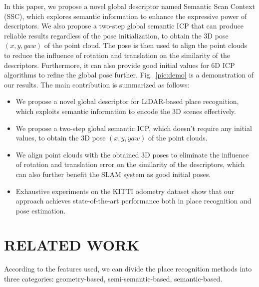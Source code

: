 \documentclass[letterpaper, 10 pt, conference]{ieeeconf}
\begin{document}
In this paper, we propose a novel global descriptor named Semantic Scan Context (SSC), which explores semantic information to enhance the expressive power of descriptors. We also propose a two-step global semantic ICP that can produce reliable results regardless of the pose initialization, to obtain the 3D pose $(x,y,yaw)$ of the point cloud. The pose is then used to align the point clouds to reduce the influence of rotation and translation on the similarity of the descriptors. Furthermore, it can also provide good initial values for 6D ICP algorithms to refine the global pose further. Fig.~\ref{pic:demo} is a demonstration of our results. The main contribution is summarized as follows:
\begin{itemize}
    \item We propose a novel global descriptor for LiDAR-based place recognition, which exploits semantic information to encode the 3D scenes effectively.
\item We propose a two-step global semantic ICP, which doesn't require any initial values, to obtain the 3D pose $(x,y,yaw)$ of the point clouds.
    \item We align point clouds with the obtained 3D poses to eliminate the influence of rotation and translation error on the similarity of the descriptors, which can also further benefit the SLAM system as good initial poses.
    \item Exhaustive experiments on the KITTI odometry dataset show that our approach achieves state-of-the-art performance both in place recognition and pose estimation.
\end{itemize}



\section{RELATED WORK}

According to the features used, we can divide the place recognition methods into three categories: geometry-based, semi-semantic-based, semantic-based.
\end{document}
